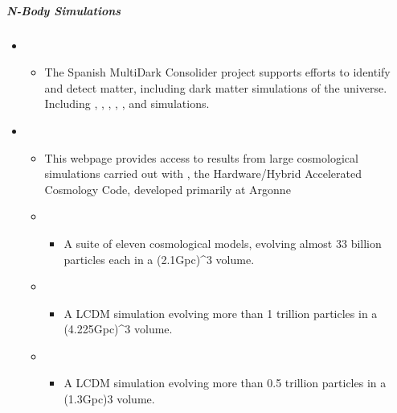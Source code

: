 \documentclass[letterpaper,10pt,english]{sphinxmanual}
\begin{document}
\subparagraph{N-Body Simulations}
\label{\detokenize{resource/astro/topics/simulations:n-body-simulations}}\begin{itemize}
\item {} 
\begin{itemize}
\item {} 
The Spanish MultiDark Consolider project supports efforts to
identify and detect matter, including dark matter simulations of
the universe. Including , , ,
, , and  simulations.

\end{itemize}

\item {} 
\begin{itemize}
\item {} 
This webpage provides access to results from large cosmological
simulations carried out with , the Hardware/Hybrid
Accelerated Cosmology Code, developed primarily at Argonne

\item {} 
\begin{itemize}
\item {} 
A suite of eleven cosmological models, evolving almost 33
billion particles each in a (2.1Gpc)\textasciicircum{}3 volume.

\end{itemize}

\item {} 
\begin{itemize}
\item {} 
A LCDM simulation evolving more than 1 trillion particles in a
(4.225Gpc)\textasciicircum{}3 volume.

\end{itemize}

\item {} 
\begin{itemize}
\item {} 
A LCDM simulation evolving more than 0.5 trillion particles in
a (1.3Gpc)3 volume.


\end{itemize}
\end{itemize}
\end{itemize}
\end{document}
